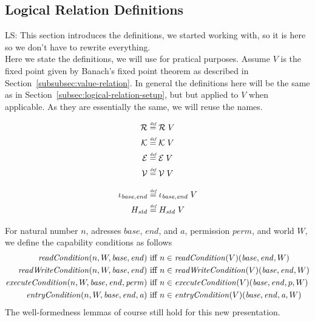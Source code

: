 \documentclass{article}
\newcommand{\defeq}{\stackrel{\textit{\tiny{def}}}{=}}
\newcommand\lau[1]{{\color{purple} \sf \footnotesize {LS: #1}}\\}
\newcommand{\var}[1]{\mathit{#1}}
\newcommand{\addr}{\var{a}}
\newcommand{\start}{\var{base}}
\newcommand{\addrend}{\var{end}}
\newcommand{\perm}{\var{perm}}
\newcommand{\plainfun}[2]{
  \ifthenelse{\equal{#2}{}}
             {\mathit{#1}}
             {\mathit{#1}(#2)}
}
\newcommand{\readCond}[1]{\plainfun{readCondition}{#1}}
\newcommand{\writeCond}[1]{\plainfun{readWriteCondition}{#1}}
\newcommand{\execCond}[1]{\plainfun{executeCondition}{#1}}
\newcommand{\entryCond}[1]{\plainfun{entryCondition}{#1}}
\newcommand{\asmType}{\plaindom{AsmType}}
\newcommand{\plaindom}[1]{\mathrm{#1}}
\newcommand{\intr}[2]{\mathcal{#1}}
\newcommand{\valueintr}[1]{\intr{V}{#1}}
\newcommand{\exprintr}[1]{\intr{E}{#1}}
\newcommand{\contintr}[1]{\intr{K}{#1}}
\newcommand{\regintr}[1]{\intr{R}{#1}}
\newcommand{\stdvr}{\valueintr{\asmType}}
\newcommand{\stder}{\exprintr{\asmType}}
\newcommand{\stdrr}{\regintr{\asmType}}
\newcommand{\stdkr}{\contintr{\asmType}}
\begin{document}
\subsection{Logical Relation Definitions}
\label{subsec:logical-relation-definitions}
\lau{This section introduces the definitions, we started working with, so it is here so we don't have to rewrite everything.}
Here we state the definitions, we will use for pratical purposes.  Assume $V$ is the fixed point given by Banach's fixed point theorem as described in Section~\ref{subsubsec:value-relation}. In general the definitions here will be the same as in Section~\ref{subsec:logical-relation-setup}, but but applied to $V$ when applicable. As they are essentially the same, we will reuse the names.

\begin{align*}
  \stdrr & \defeq \stdrr \; V \\
  \stdkr & \defeq \stdkr \; V \\
  \stder & \defeq \stder \; V \\
  \stdvr & \defeq \stdvr \; V 
\end{align*}

\begin{align*}
  \iota_{\start,\addrend} & \defeq \iota_{\start,\addrend} \; V \\
  H_{\var{std}}          & \defeq H_{\var{std}} \; V
\end{align*}

For natural number $n$, adresses $\start$, $\addrend$, and $\addr$, permission $\perm$, and world $W$, we define the capability conditions as follows
\begin{align*}
  \readCond{n,W,\start,\addrend}        & \text{ iff } n \in \readCond{}(V)(\start,\addrend,W)\\
  \writeCond{n,W,\start,\addrend}       & \text{ iff } n \in \writeCond{}(V)(\start,\addrend,W)\\
  \execCond{n,W,\start,\addrend,\perm}  & \text{ iff } n \in \execCond{}(V)(\start,\addrend,p,W)\\
  \entryCond{n,W,\start,\addrend,\addr} & \text{ iff } n \in \entryCond{}(V)(\start,\addrend,\addr,W)
\end{align*}
The well-formedness lemmas of course still hold for this new presentation.
\end{document}
